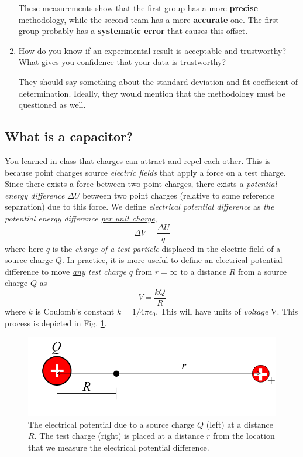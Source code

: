 \documentclass[12pt]{report}
\begin{document}
\begin{enumerate}
\begin{tcolorbox}[title=Answer]
These measurements show that the first group has a more \textbf{precise} methodology, while the second team has a more \textbf{accurate} one. The first group probably has a \textbf{systematic error} that causes this offset.
\end{tcolorbox}
\item How do you know if an experimental result is acceptable and trustworthy? What gives you confidence that your data is trustworthy?
\begin{tcolorbox}[title=Answer]
They should say something about the standard deviation and fit coefficient of determination. Ideally, they would mention that the methodology must be questioned as well.
\end{tcolorbox}
\end{enumerate}

\subsection{What is a capacitor?}
You  learned in class that charges can attract and repel each other. This is because point charges source \textit{electric fields} that apply a force on a test charge. Since there exists a force between two point charges, there exists a \textit{potential energy difference}  $\Delta U$ between two point charges (relative to some reference separation) due to this force. We define  \textit{electrical potential difference} as \textit{the potential energy difference  \underline{per unit charge}}, 
\begin{equation}
\Delta V = \frac{\Delta U}{q}
\label{Eq:ElectricPotential}
\end{equation}
where here $q$ is the \textit{charge of a test particle} displaced in the electric field of a source charge $Q$. In practice, it is more useful to define an electrical potential difference to move \textit{\underline{any} test charge} $q$ from $r=\infty$ to a distance $R$ from a source charge $Q$ as
\begin{equation}
V = \frac{k Q}{R}
\label{Eq:ElectricPotential_point}
\end{equation}
where $k$ is Coulomb's constant $k = {1}/{4\pi \epsilon_0}$. This will have units of \textit{voltage} V. This process is depicted in Fig. \ref{Fig:ElectricPotential_point}.
\begin{figure}[h]
\centering
\includegraphics[width=0.7 \textwidth]{lab1-electric-potential.png}
\caption{The electrical potential due to a source charge $Q$ (left) at a distance $R$. The test charge (right) is placed at a distance $r$ from the location that we measure the electrical potential difference.}
\label{Fig:ElectricPotential_point}
\end{figure}
\end{document}
